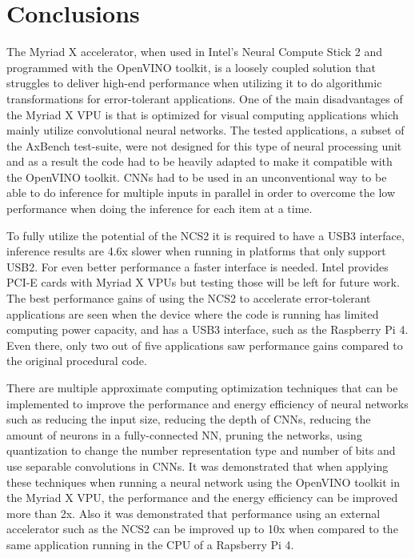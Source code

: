 \chapter{Conclusions}
\label{ch:conclusion}

The Myriad X accelerator, when used in Intel's Neural Compute Stick 2 and programmed with the OpenVINO toolkit, is a loosely coupled solution that struggles to deliver high-end performance when utilizing it to do algorithmic transformations for error-tolerant applications. One of the main disadvantages of the Myriad X VPU is that is optimized for visual computing applications which mainly utilize convolutional neural networks. The tested applications, a subset of the AxBench test-suite, were not designed for this type of neural processing unit and as a result the code had to be heavily adapted to make it compatible with the OpenVINO toolkit. CNNs had to be used in an unconventional way to be able to do inference for multiple inputs in parallel in order to overcome the low performance when doing the inference for each item at a time.

To fully utilize the potential of the NCS2 it is required to have a USB3 interface, inference results are 4.6x slower when running in platforms that only support USB2. For even better performance a faster interface is needed. Intel provides PCI-E cards with Myriad X VPUs but testing those will be left for future work. The best performance gains of using the NCS2 to accelerate error-tolerant applications are seen when the device where the code is running has limited computing power capacity, and has a USB3 interface, such as the Raspberry Pi 4. Even there, only two out of five applications saw performance gains compared to the original procedural code.

There are multiple approximate computing optimization techniques that can be implemented to improve the performance and energy efficiency of neural networks such as reducing the input size, reducing the depth of CNNs, reducing the amount of neurons in a fully-connected NN, pruning the networks, using quantization to change the number representation type and number of bits and use separable convolutions in CNNs. It was demonstrated that when applying these techniques when running a neural network using the OpenVINO toolkit in the Myriad X VPU, the performance and the energy efficiency can be improved more than 2x. Also it was demonstrated that performance using an external accelerator such as the NCS2 can be improved up to 10x when compared to the same application running in the CPU of a Rapsberry Pi 4.

